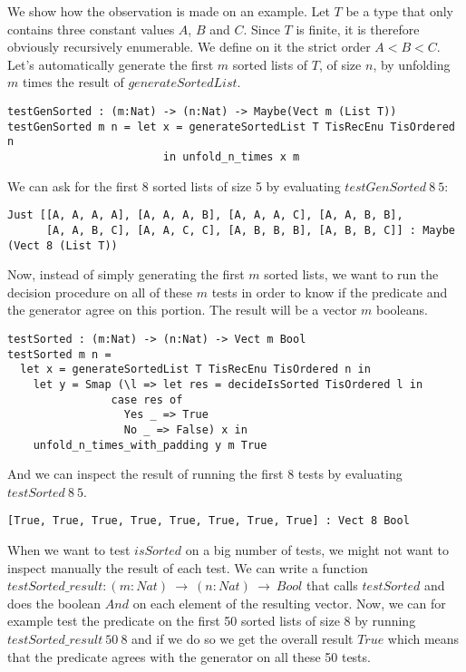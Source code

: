 We show how the observation is made on an example. Let $T$ be a type that only contains three constant values $A$, $B$ and $C$. Since $T$ is finite, it is therefore obviously recursively enumerable. We define on it the strict order $A < B < C$.
Let's automatically generate the first $m$ sorted lists of $T$, of size $n$, by unfolding $m$ times the result of $generateSortedList$.


\begin{lstlisting}
testGenSorted : (m:Nat) -> (n:Nat) -> Maybe(Vect m (List T))
testGenSorted m n = let x = generateSortedList T TisRecEnu TisOrdered n 
                        in unfold_n_times x m
\end{lstlisting}
We can ask for the first 8 sorted lists of size 5 by evaluating $testGenSorted\ 8\ 5$:

\begin{lstlisting}
Just [[A, A, A, A], [A, A, A, B], [A, A, A, C], [A, A, B, B],
      [A, A, B, C], [A, A, C, C], [A, B, B, B], [A, B, B, C]] : Maybe (Vect 8 (List T))
\end{lstlisting}
Now, instead of simply generating the first $m$ sorted lists, we want to run the decision procedure on all of these $m$ tests in order to know if the predicate and the generator agree on this portion. The result will be a vector $m$ booleans.

\begin{lstlisting}
testSorted : (m:Nat) -> (n:Nat) -> Vect m Bool
testSorted m n = 
  let x = generateSortedList T TisRecEnu TisOrdered n in
    let y = Smap (\l => let res = decideIsSorted TisOrdered l in
			    case res of
			      Yes _ => True
			      No _ => False) x in
	unfold_n_times_with_padding y m True
\end{lstlisting}
And we can inspect the result of running the first 8 tests by evaluating $testSorted\ 8\ 5$.

\begin{lstlisting}
[True, True, True, True, True, True, True, True] : Vect 8 Bool
\end{lstlisting}
When we want to test $isSorted$ on a big number of tests, we might not want to inspect manually the result of each test. We can write a function $testSorted\_result : (m:Nat)\ \rightarrow\ (n:Nat)\ \rightarrow\ Bool$ that calls $testSorted$ and does the boolean $And$ on each element of the resulting vector. Now, we can for example test the predicate on the first 50 sorted lists of size 8 by running $testSorted\_result\ 50\ 8$ and if we do so we get the overall result $True$ which means that the predicate agrees with the generator on all these 50 tests.


